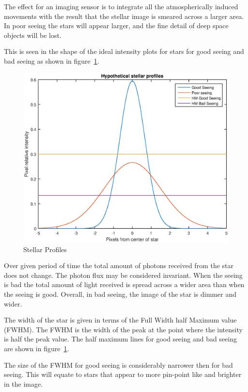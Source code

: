 \documentclass[11pt]{article}
\begin{document}
The effect for an imaging sensor is to integrate all the atmospherically induced movements with the result that the stellar image is smeared across a larger area.  In poor seeing the stars will appear larger, and the fine detail of deep space objects will be lost.


This is seen in the shape of the ideal intensity plots for stars for good seeing and bad seeing as shown in figure~\ref{fig:stellar-profiles}.

\begin{figure}[htb]
	\begin{center}
		\includegraphics[scale=0.7]{stellar-profiles.eps}
		\caption{Stellar Profiles}
		\label{fig:stellar-profiles}
	\end{center}
\end{figure}

Over given period of time the total amount of photons received from the star does not change. The photon flux may be considered invariant. When the seeing is bad the total amount of light received is spread across a wider area than when the seeing is good. Overall, in bad seeing, the image of the star is dimmer and wider.

The width of the star is given in terms of the Full Width half Maximum value (FWHM).  The FWHM is the width of the peak at the point where the intensity is half the peak value.  The half maximum lines for good seeing and bad seeing are shown in figure~\ref{fig:stellar-profiles}.

The size of the FWHM for good seeing is considerably narrower then for bad seeing.  This will equate to stars that appear to more pin-point like and brighter in the image.
\end{document}
